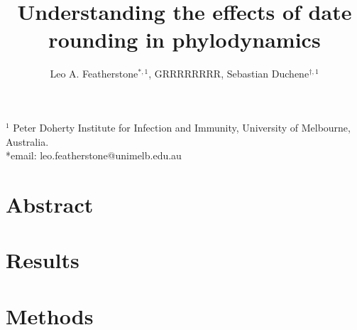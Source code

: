 \documentclass{article}
\title{Understanding the effects of date rounding in phylodynamics}
\author{Leo A. Featherstone$^{\ast,1}$, GRRRRRRRR, Sebastian Duchene$^{\dagger,1}$}
\begin{document}
\maketitle
$^{1}$ Peter Doherty Institute for Infection and Immunity, University of Melbourne, Australia.\\
*email: leo.featherstone@unimelb.edu.au

\section*{Abstract}

\section*{Results}

\section*{Methods}
\end{document}
